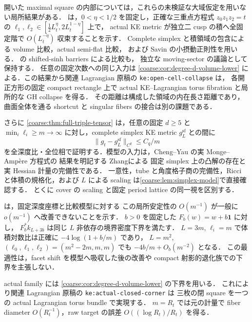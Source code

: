 \documentclass[a4paper,11pt]{ltjsarticle}
\numberwithin{equation}{section}
\theoremstyle{plain}
\theoremstyle{definition}
\theoremstyle{remark}
\begin{document}
開いた maximal square の内部については，これらの未検証な大域仮定を用いない局所結果がある．
 は，$0<\eta<1/2$ を固定し，正確な三重点方程式
$z_0z_1z_2=t$ の $\ell_1,\ell_2\in[\tfrac12L_t^\eta,2L_t^{1-\eta}]$ 上で，
actual KE metric が独立二 cusp の積へ全固定階で $O(L_t^{-\eta})$ 収束することを示す．
Complete simplex と積領域の包含による volume 比較，actual semi-flat 比較，
および Savin\cite[Theorem~1.3]{SavinSmall} の小摂動正則性を用いる．
 の shifted-sinh barriers による比較も，
独立な moving-sector の議論として保持する．
任意の固定次数への同じ入力は \cref{coarse:cor:degree-d-volume-lower} による．この結果から関連 Lagrangian 原稿の \texttt{ke:open-cell-collapse} は，
各開正方形の固定 compact rectangle 上で actual KE--Lagrangian torus fibration と局所的な GH collapse を得る．
その距離は構成した領域の内在長さ距離であり，曲面全体を通る shortcut と singular fibers の接合は別の課題である．

さらに \cref{coarse:thm:full-triple-tensor} は，任意の固定 $d\ge5$ と
$\min_i\ell_i\ge m\to\infty$ に対し，complete simplex KE metric $g_L^{\mathrm{sf}}$ との間に
\[
 \|g_t-g_L^{\mathrm{sf}}\|_{C^q}\le C_q/m
\]
を全深度比・全位相で証明する．模型の入力は，Cheng--Yau の実 Monge--Amp\`ere 方程式の
結果\cite{ChengYauAffine}を明記する Zhang\cite[Theorem~2.1]{ZhangNegativeKE}による
固定 simplex 上の凸解の存在と実 Hessian 計量の完備性である．
一意性，tube と角度格子商の完備性，Ricci と体積の規格化，および $L$ による
scaling は\cref{coarse:lem:simplex-model}で直接確認する．
とくに cover の scaling と固定 period lattice の同一視を区別する．

 は，固定深度座標と比較模型に対する
この局所安定性の $O(m^{-1})$ が一般に $o(m^{-1})$ へ改善できないことを示す．
$b>0$ を固定した $F_b(w)=w+b\mathbf1$ に対し，
$F_b^*k_{L+3b}$ は同じ $L$ 非依存の境界密度下界を満たす．
$L=3m$, $\ell_i=m$ で体積対数比は正確に $-4\log(1+b/m)$ であり，
$L=m^2$, $(\ell_0,\ell_1,\ell_2)=(m^2-2m,m,m)$ でも
$-4b/m+O_b(m^{-2})$ となる．
この最適性は，facet shift を模型へ吸収した後の改善や
compact 射影的退化族での下界を主張しない．

actual family には \cref{coarse:cor:degree-d-volume-lower} の下界を用いる．
これにより関連 Lagrangian 原稿の \texttt{ke:actual-closed-corner} は
三枚の閉 square を一つの actual Lagrangian torus bundle で実現する．
$m=R_t$ では元の計量で fiber diameter $O(R_t^{-1})$，raw target の誤差
$O((\log R_t)/R_t)$ を得る．
\end{document}

